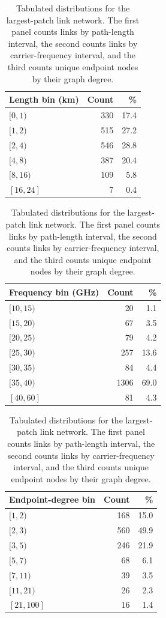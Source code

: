 \documentclass[11pt]{article}
\begin{document}
\begin{table}[H]
  \centering
  \begin{minipage}[t]{0.31\textwidth}
    \centering
    \scriptsize
    \begin{tabular}{lrr}
      \toprule
      Length bin (km) & Count & \% \\
      \midrule
      $[0,1)$ & 330 & 17.4 \\
      $[1,2)$ & 515 & 27.2 \\
      $[2,4)$ & 546 & 28.8 \\
      $[4,8)$ & 387 & 20.4 \\
      $[8,16)$ & 109 & 5.8 \\
      $[16,24]$ & 7 & 0.4 \\
      \bottomrule
    \end{tabular}
  \end{minipage}
  \hfill
  \begin{minipage}[t]{0.31\textwidth}
    \centering
    \scriptsize
    \begin{tabular}{lrr}
      \toprule
      Frequency bin (GHz) & Count & \% \\
      \midrule
      $[10,15)$ & 20 & 1.1 \\
      $[15,20)$ & 67 & 3.5 \\
      $[20,25)$ & 79 & 4.2 \\
      $[25,30)$ & 257 & 13.6 \\
      $[30,35)$ & 84 & 4.4 \\
      $[35,40)$ & 1306 & 69.0 \\
      $[40,60]$ & 81 & 4.3 \\
      \bottomrule
    \end{tabular}
  \end{minipage}
  \hfill
  \begin{minipage}[t]{0.31\textwidth}
    \centering
    \scriptsize
    \begin{tabular}{lrr}
      \toprule
      Endpoint-degree bin & Count & \% \\
      \midrule
      $[1,2)$ & 168 & 15.0 \\
      $[2,3)$ & 560 & 49.9 \\
      $[3,5)$ & 246 & 21.9 \\
      $[5,7)$ & 68 & 6.1 \\
      $[7,11)$ & 39 & 3.5 \\
      $[11,21)$ & 26 & 2.3 \\
      $[21,100]$ & 16 & 1.4 \\
      \bottomrule
    \end{tabular}
  \end{minipage}
  \caption{Tabulated distributions for the largest-patch link network. The first panel counts links by path-length interval, the second counts links by carrier-frequency interval, and the third counts unique endpoint nodes by their graph degree.}
\end{table}
\end{document}
